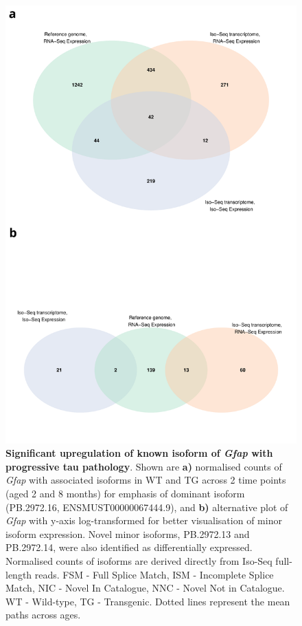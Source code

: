 \begin{figure}[!htp]
	\centering
	\includegraphics[page=4,scale = 0.55]{Figures/WholeDifferentialAnalysis.pdf}
	\captionsetup{width=0.95\textwidth}
	\caption[Differential Isoform Expression: Changes in transcript expression of isoforms associated with \textit{Gfap}]%
	{\textbf{Significant upregulation of known isoform of \textit{Gfap} with progressive tau pathology}. Shown are \textbf{a)} normalised counts of \textit{Gfap} with associated isoforms in WT and TG across 2 time points (aged 2 and 8 months) for emphasis of dominant isoform (PB.2972.16, ENSMUST00000067444.9), and \textbf{b)} alternative plot of \textit{Gfap} with y-axis log-transformed for better visualisation of minor isoform expression. Novel minor isoforms, PB.2972.13 and PB.2972.14, were also identified as differentially expressed. Normalised counts of isoforms are derived directly from Iso-Seq full-length reads. FSM - Full Splice Match, ISM - Incomplete Splice Match, NIC - Novel In Catalogue, NNC - Novel Not in Catalogue. WT - Wild-type, TG - Transgenic. Dotted lines represent the mean paths across ages.} 
	\label{fig:DEI_gfap}
\end{figure}

